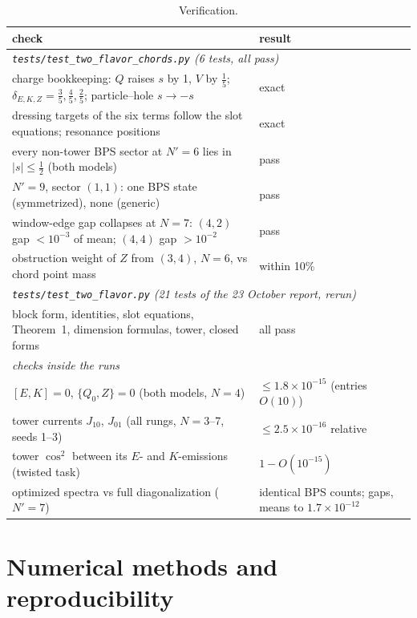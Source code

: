 \documentclass[11pt]{article}
\newcommand{\Np}{N'}
\theoremstyle{plain}
\theoremstyle{remark}
\numberwithin{equation}{section}
\begin{document}
\begin{table}[ht]
\centering\small
\begin{tabular}{p{7.2cm}p{7.6cm}}
\toprule
check & result\\
\midrule
\multicolumn{2}{l}{\emph{\texttt{tests/test\_two\_flavor\_chords.py} (6 tests, all pass)}}\\
charge bookkeeping: $Q$ raises $s$ by 1, $V$ by $\tfrac15$; $\delta_{E,K,Z}=\tfrac35,\tfrac45,\tfrac25$; particle--hole $s\to-s$ & exact\\
dressing targets of the six terms follow the slot equations; resonance positions & exact\\
every non-tower BPS sector at $\Np=6$ lies in $|s|\le\tfrac12$ (both models) & pass\\
$\Np=9$, sector $(1,1)$: one BPS state (symmetrized), none (generic) & pass\\
window-edge gap collapses at $N=7$: $(4,2)$ gap $<10^{-3}$ of mean; $(4,4)$ gap $>10^{-2}$ & pass\\
obstruction weight of $Z$ from $(3,4)$, $N=6$, vs chord point mass & within 10\%\\
\multicolumn{2}{l}{\emph{\texttt{tests/test\_two\_flavor.py} (21 tests of the 23 October report, rerun)}}\\
block form, identities, slot equations, Theorem~1, dimension formulas, tower, closed forms & all pass\\
\multicolumn{2}{l}{\emph{checks inside the runs}}\\
$[E,K]=0$, $\{Q_0,Z\}=0$ (both models, $N=4$) & $\le1.8\times10^{-15}$ (entries $O(10)$)\\
tower currents $J_{10}$, $J_{01}$ (all rungs, $N=3$--7, seeds 1--3) & $\le2.5\times10^{-16}$ relative\\
tower $\cos^2$ between its $E$- and $K$-emissions (twisted task) & $1-O(10^{-15})$\\
optimized spectra vs full diagonalization ($\Np=7$) & identical BPS counts; gaps, means to $1.7\times10^{-12}$\\
\bottomrule
\end{tabular}
\caption{Verification.}
\end{table}

\section{Numerical methods and reproducibility}\label{app:repro}
\end{document}
